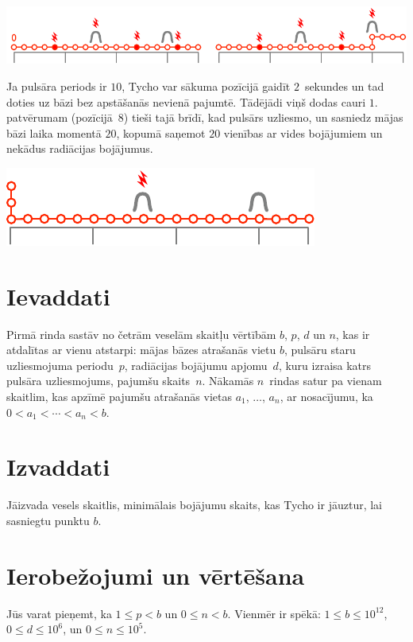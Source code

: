 \includegraphics[width=.8\textwidth]{img/sample1_2.pdf}

Ja pulsāra periods ir $10$, Tycho var sākuma pozīcijā gaidīt $2$~sekundes un tad doties uz bāzi bez apstāšanās nevienā pajumtē.
Tādējādi viņš dodas cauri $1.$ patvērumam (pozīcijā~$8$) tieši tajā brīdī, kad pulsārs uzliesmo, un sasniedz mājas bāzi laika momentā $20$, kopumā saņemot $20$ vienības ar vides bojājumiem un nekādus radiācijas bojājumus.

\includegraphics[width=.4\textwidth]{img/sample3.pdf}

\section*{Ievaddati}

Pirmā rinda sastāv no četrām veselām skaitļu vērtībām $b$, $p$, $d$ un $n$, kas ir atdalītas ar vienu atstarpi:
mājas bāzes atrašanās vietu $b$,
pulsāru staru uzliesmojuma periodu~$p$,
radiācijas bojājumu apjomu~$d$, kuru izraisa katrs pulsāra uzliesmojums,
pajumšu skaits~$n$.
Nākamās $n$~rindas satur pa vienam skaitlim, kas apzīmē pajumšu atrašanās vietas $a_1$, $\ldots$, $a_n$, ar nosacījumu, ka
$0<a_1<\cdots <a_n< b$. %

\section*{Izvaddati}

Jāizvada vesels skaitlis, minimālais bojājumu skaits, kas Tycho ir jāuztur, lai sasniegtu punktu $b$.


\section*{Ierobežojumi un vērtēšana}

Jūs varat pieņemt, ka
$1\leq p < b$ %
un
$0 \leq n < b$. %
Vienmēr ir spēkā:
$1\leq b\leq 10^{12}$, %
$0\leq d \leq 10^6$, %
un
$0\leq n \leq 10^5$. %

